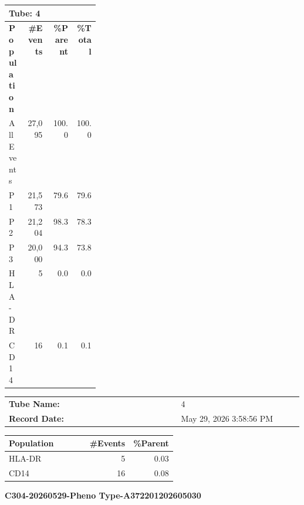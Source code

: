 \documentclass[UTF8,10pt,a4paper,fontset=fandol]{ctexart}
\begin{document}
\begin{center}
\begin{tabular}{|p{0.18\linewidth}|r|r|r|}
\hline
\multicolumn{4}{|l|}{\textbf{Tube: 4}}\\
\hline
\textbf{Population} & \textbf{\#Events} & \textbf{\%Parent} & \textbf{\%Total}\\
\hline
All Events & 27,095 & 100.0 & 100.0\\
\quad P1 & 21,573 & 79.6 & 79.6\\
\quad\quad P2 & 21,204 & 98.3 & 78.3\\
\quad\quad\quad P3 & 20,000 & 94.3 & 73.8\\
\quad\quad\quad\quad HLA-DR & 5 & 0.0 & 0.0\\
\quad\quad\quad\quad CD14 & 16 & 0.1 & 0.1\\
\hline
\end{tabular}
\end{center}

\vspace{0.25cm}

\begin{center}
\begin{tabular}{|p{0.48\linewidth}|p{0.34\linewidth}|}
\hline
\textbf{Tube Name:} & 4\\
\textbf{Record Date:} & May 29, 2026 3:58:56 PM\\
\hline
\end{tabular}

\vspace{0.2cm}

\begin{tabular}{|p{0.48\linewidth}|r|r|}
\hline
\textbf{Population} & \textbf{\#Events} & \textbf{\%Parent}\\
\hline
HLA-DR & 5 & 0.03\\
CD14 & 16 & 0.08\\
\hline
\end{tabular}
\end{center}

\newpage

\begin{center}
\textbf{C304-20260529-Pheno Type-A372201202605030}
\end{center}
\end{document}
